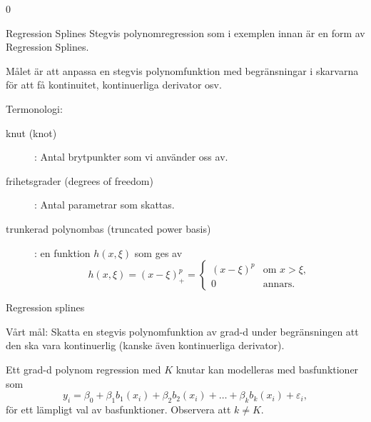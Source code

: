 0\documentclass[10pt,english]{beamer}
\begin{document}
\begin{frame}{Regression Splines}
    Stegvis polynomregression som i exemplen innan är en form av Regression Splines.

    \begin{bluebox}
    Målet är att anpassa en stegvis polynomfunktion med begränsningar i skarvarna för att få kontinuitet, kontinuerliga derivator osv.
    \end{bluebox}

    Termonologi:
    \begin{description}
        \item[knut (knot)]: Antal brytpunkter som vi använder oss av.
        \item[frihetsgrader (degrees of freedom)]: Antal parametrar som skattas.
        \item[trunkerad polynombas (truncated power basis)]: en funktion $h(x,\xi)$ som ges av
        \begin{equation*}
            h(x,\xi) = (x - \xi)^p_+ = \begin{cases}
                (x - \xi)^p & \text{om } x > \xi, \\
                0 & \text{annars.}
            \end{cases}
        \end{equation*} 
    \end{description}
\end{frame}

\begin{frame}{Regression splines}
    
    \begin{greenbox}
        Vårt mål: Skatta en stegvis polynomfunktion av grad-d under begränsningen att den ska vara kontinuerlig (kanske även kontinuerliga derivator).
    \end{greenbox}

    Ett grad-d polynom regression med $K$ knutar kan modelleras med basfunktioner som
    \begin{equation*}
        y_i = \beta_0 + \beta_1 b_1(x_i) + \beta_2 b_2(x_i) + \ldots + \beta_k b_k(x_i) + \varepsilon_i,
    \end{equation*}
    för ett lämpligt val av basfunktioner. Observera att $k \neq K$.

\end{frame}
\end{document}
